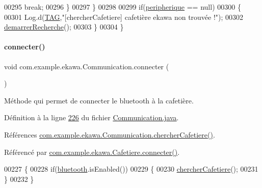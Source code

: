 \begin{DoxyCode}
00295                 \textcolor{keywordflow}{break};
00296             \}
00297         \}
00298 
00299         \textcolor{keywordflow}{if}(\hyperlink{classcom_1_1example_1_1ekawa_1_1_communication_a59a25b4807148701560e4341f79c0c16}{peripherique} == null)
00300         \{
00301             Log.d(\hyperlink{classcom_1_1example_1_1ekawa_1_1_communication_af355bac38153a4e6d1cda0b3e74bc1c7}{TAG},\textcolor{stringliteral}{"[chercherCafetiere] cafetière ekawa non trouvée !"});
00302             \hyperlink{classcom_1_1example_1_1ekawa_1_1_communication_a4b8036f1d4f4f37e15c85886af645900}{demarrerRecherche}();
00303         \}
00304     \}
\end{DoxyCode}
\mbox{\label{classcom_1_1example_1_1ekawa_1_1_communication_af0cb2a6a5c1674a7204174ba786e8596}} 
\paragraph{\texorpdfstring{connecter()}{connecter()}}
{\footnotesize\ttfamily void com.\+example.\+ekawa.\+Communication.\+connecter (\begin{DoxyParamCaption}{ }\end{DoxyParamCaption})}



Méthode qui permet de connecter le bluetooth à la cafetière. 



Définition à la ligne \hyperlink{_communication_8java_source_l00226}{226} du fichier \hyperlink{_communication_8java_source}{Communication.\+java}.



Références \hyperlink{_communication_8java_source_l00276}{com.\+example.\+ekawa.\+Communication.\+chercher\+Cafetiere()}.



Référencé par \hyperlink{_cafetiere_8java_source_l00438}{com.\+example.\+ekawa.\+Cafetiere.\+connecter()}.


\begin{DoxyCode}
00227     \{
00228         \textcolor{keywordflow}{if}(\hyperlink{classcom_1_1example_1_1ekawa_1_1_communication_a0ed43f74b2eae7e8f150b049953da384}{bluetooth}.isEnabled())
00229         \{
00230             \hyperlink{classcom_1_1example_1_1ekawa_1_1_communication_afc96e58f53fc167fe9fc76a229c01cb0}{chercherCafetiere}();
00231         \}
00232     \}
\end{DoxyCode}
\mbox{\label{classcom_1_1example_1_1ekawa_1_1_communication_a41f24da10de9e598f65941bf55320566}} 
